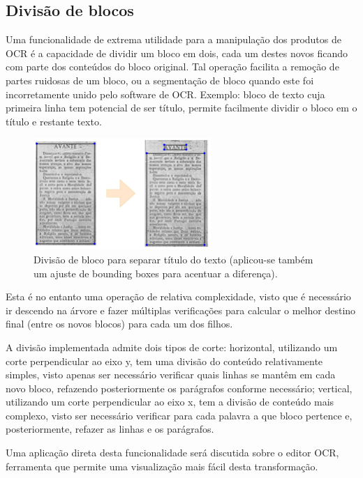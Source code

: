 \subsection{Divisão de blocos}
\label{contribution_divide_blocks}

Uma funcionalidade de extrema utilidade para a manipulação dos produtos de OCR é a capacidade de dividir um bloco em dois, cada um destes novos ficando com parte dos conteúdos do bloco original. Tal operação facilita a remoção de partes ruidosas de um bloco, ou a segmentação de bloco quando este foi incorretamente unido pelo software de OCR. Exemplo: bloco de texto cuja primeira linha tem potencial de ser título, permite facilmente dividir o bloco em o título e restante texto.

\begin{figure}[H]
	\centering
	\includegraphics[width=0.6\textwidth]{images/ilustracoes/split_blocks_example.png}
	\caption{Divisão de bloco para separar título do texto (aplicou-se também um ajuste de bounding boxes para acentuar a diferença).}
	\label{fig:split_blocks_example}
\end{figure}


Esta é no entanto uma operação de relativa complexidade, visto que é necessário ir descendo na árvore e fazer múltiplas verificações para calcular o melhor destino final (entre os novos blocos) para cada um dos filhos.

A divisão implementada admite dois tipos de corte: horizontal, utilizando um corte perpendicular ao eixo y, tem uma divisão do conteúdo relativamente simples, visto apenas ser necessário verificar quais linhas se mantêm em cada novo bloco, refazendo posteriormente os parágrafos conforme necessário; vertical, utilizando um corte perpendicular ao eixo x, tem a divisão de conteúdo mais complexo, visto ser necessário verificar para cada palavra a que bloco pertence e, posteriormente, refazer as linhas e os parágrafos. 

Uma aplicação direta desta funcionalidade será discutida sobre o editor OCR, ferramenta que permite uma visualização mais fácil desta transformação.



